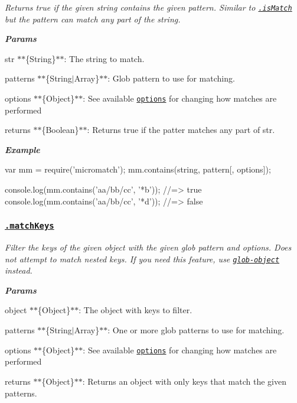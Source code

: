 {\itshape }

{\itshape Returns true if the given {\ttfamily string} contains the given pattern. Similar to \href{#isMatch}{\tt .is\+Match} but the pattern can match any part of the string.}

{\itshape {\bfseries Params}}

{\itshape 
\begin{DoxyItemize}
\item {\ttfamily str} $\ast$$\ast$\{String\}$\ast$$\ast$\+: The string to match.
\item {\ttfamily patterns} $\ast$$\ast$\{String$\vert$\+Array\}$\ast$$\ast$\+: Glob pattern to use for matching.
\item {\ttfamily options} $\ast$$\ast$\{Object\}$\ast$$\ast$\+: See available \href{#options}{\tt options} for changing how matches are performed
\item {\ttfamily returns} $\ast$$\ast$\{Boolean\}$\ast$$\ast$\+: Returns true if the patter matches any part of {\ttfamily str}.
\end{DoxyItemize}}

{\itshape {\bfseries Example}}

{\itshape 
\begin{DoxyCode}
var mm = require('micromatch');
mm.contains(string, pattern[, options]);

console.log(mm.contains('aa/bb/cc', '*b'));
//=> true
console.log(mm.contains('aa/bb/cc', '*d'));
//=> false
\end{DoxyCode}
}

{\itshape \subsubsection*{\href{index.js#L432}{\tt .match\+Keys}}}

{\itshape }

{\itshape Filter the keys of the given object with the given {\ttfamily glob} pattern and {\ttfamily options}. Does not attempt to match nested keys. If you need this feature, use \href{https://github.com/jonschlinkert/glob-object}{\tt glob-\/object} instead.}

{\itshape {\bfseries Params}}

{\itshape 
\begin{DoxyItemize}
\item {\ttfamily object} $\ast$$\ast$\{Object\}$\ast$$\ast$\+: The object with keys to filter.
\item {\ttfamily patterns} $\ast$$\ast$\{String$\vert$\+Array\}$\ast$$\ast$\+: One or more glob patterns to use for matching.
\item {\ttfamily options} $\ast$$\ast$\{Object\}$\ast$$\ast$\+: See available \href{#options}{\tt options} for changing how matches are performed
\item {\ttfamily returns} $\ast$$\ast$\{Object\}$\ast$$\ast$\+: Returns an object with only keys that match the given patterns.
\end{DoxyItemize}}

